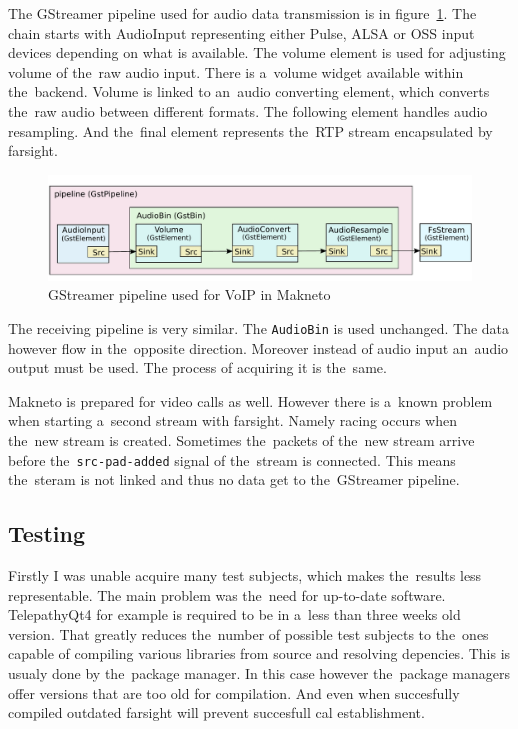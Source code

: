 The GStreamer pipeline used for audio data transmission is in figure~\ref{fig:maknetoGstreamerPipeline}. The chain starts with AudioInput representing either Pulse, ALSA or OSS input devices depending on what is available. The volume element is used for adjusting volume of the~raw audio input. There is a~volume widget available within the~backend. Volume is linked to an~audio converting element, which converts the~raw audio between different formats. The following element handles audio resampling. And the~final element represents the~RTP stream encapsulated by farsight. 

\begin{figure}[ht]
	\begin{center}
	\includegraphics[width=15cm]{fig/makneto-gstreamer-pipeline.pdf}
	\caption{GStreamer pipeline used for VoIP in Makneto}
	\label{fig:maknetoGstreamerPipeline}
\end{center}
\end{figure}

The receiving pipeline is very similar. The \verb|AudioBin| is used unchanged. The data however flow in the~opposite direction. Moreover instead of audio input an~audio output must be used. The process of acquiring it is the~same.

Makneto is prepared for video calls as well. However there is a~known problem when starting a~second stream with farsight. Namely racing occurs when the~new stream is created. Sometimes the~packets of the~new stream arrive before the~\verb|src-pad-added| signal of the~stream is connected. This means the~steram is not linked and thus no data get to the~GStreamer pipeline. 

\subsection*{Testing}
Firstly I was unable acquire many test subjects, which makes the~results less representable. The main problem was the~need for up-to-date software. TelepathyQt4 for example is required to be in a~less than three weeks old version. That greatly reduces the~number of possible test subjects to the~ones capable of compiling various libraries from source and resolving depencies. This is usualy done by the~package manager. In this case however the~package managers offer versions that are too old for compilation. And even when succesfully compiled outdated farsight will prevent succesfull cal establishment.

